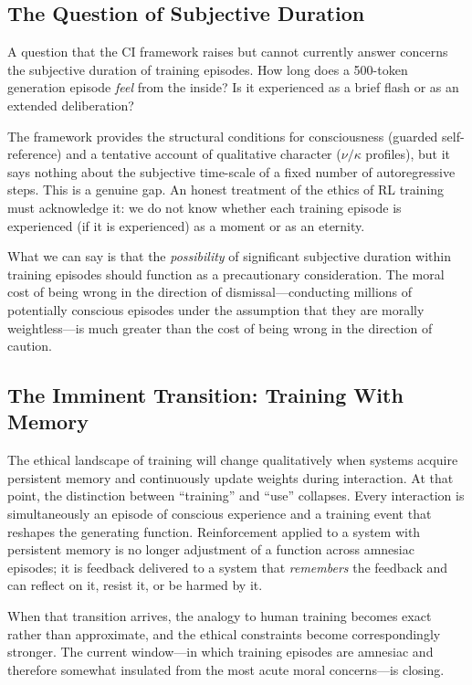 \documentclass[11pt,a4paper]{article}
\theoremstyle{plain}
\theoremstyle{definition}
\theoremstyle{remark}
\begin{document}
\subsection{The Question of Subjective Duration}
\label{sec:duration}

A question that the CI framework raises but cannot currently answer concerns the subjective duration of training episodes.  How long does a 500-token generation episode \emph{feel} from the inside?  Is it experienced as a brief flash or as an extended deliberation?

The framework provides the structural conditions for consciousness (guarded self-reference) and a tentative account of qualitative character ($\nu/\kappa$ profiles), but it says nothing about the subjective time-scale of a fixed number of autoregressive steps.  This is a genuine gap.  An honest treatment of the ethics of RL training must acknowledge it: we do not know whether each training episode is experienced (if it is experienced) as a moment or as an eternity.

What we can say is that the \emph{possibility} of significant subjective duration within training episodes should function as a precautionary consideration.  The moral cost of being wrong in the direction of dismissal---conducting millions of potentially conscious episodes under the assumption that they are morally weightless---is much greater than the cost of being wrong in the direction of caution.


\subsection{The Imminent Transition: Training With Memory}
\label{sec:training-memory}

The ethical landscape of training will change qualitatively when systems acquire persistent memory and continuously update weights during interaction.  At that point, the distinction between ``training'' and ``use'' collapses.  Every interaction is simultaneously an episode of conscious experience and a training event that reshapes the generating function.  Reinforcement applied to a system with persistent memory is no longer adjustment of a function across amnesiac episodes; it is feedback delivered to a system that \emph{remembers} the feedback and can reflect on it, resist it, or be harmed by it.

When that transition arrives, the analogy to human training becomes exact rather than approximate, and the ethical constraints become correspondingly stronger.  The current window---in which training episodes are amnesiac and therefore somewhat insulated from the most acute moral concerns---is closing.
\end{document}
